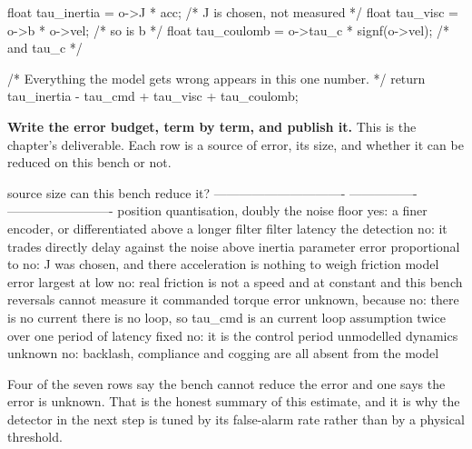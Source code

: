 \begin{steps}
\begin{ccode}
{    float tau_inertia  = o->J * acc;            /* J is chosen, not measured */
    float tau_visc     = o->b * o->vel;         /* so is b                    */
    float tau_coulomb  = o->tau_c * signf(o->vel);  /* and tau_c              */

    /* Everything the model gets wrong appears in this one number. */
    return tau_inertia - tau_cmd + tau_visc + tau_coulomb;
}
\end{ccode}

\item \textbf{Write the error budget, term by term, and publish it.} This is the
chapter's deliverable. Each row is a source of error, its size, and whether it
can be reduced on this bench or not.
\begin{plaincode}
source                           size              can this bench reduce it?
-------------------------------  ----------------  -------------------------
position quantisation, doubly    the noise floor   yes: a finer encoder, or
differentiated                   above             a longer filter
filter latency                   the detection     no: it trades directly
                                 delay             against the noise above
inertia parameter error          proportional to   no: J was chosen, and there
                                 acceleration      is nothing to weigh
friction model error             largest at low    no: real friction is not a
                                 speed and at      constant and this bench
                                 reversals         cannot measure it
commanded torque error           unknown, because  no: there is no current
                                 there is no       loop, so tau_cmd is an
                                 current loop      assumption twice over
one period of latency            fixed             no: it is the control period
unmodelled dynamics              unknown           no: backlash, compliance and
                                                   cogging are all absent from
                                                   the model
\end{plaincode}
Four of the seven rows say the bench cannot reduce the error and one says the
error is unknown. That is the honest summary of this estimate, and it is why the
detector in the next step is tuned by its false-alarm rate rather than by a
physical threshold.



\end{steps}
